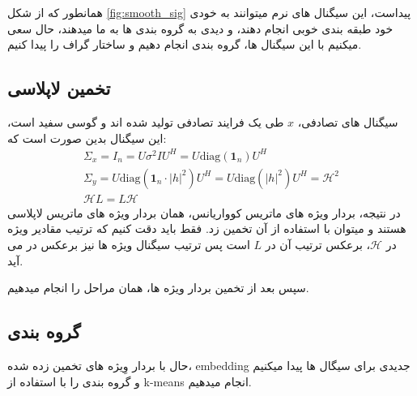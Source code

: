 همانطور که از شکل \ref*{fig:smooth_sig} پیداست، این سیگنال های نرم میتوانند به خودی خود طبقه بندی خوبی انجام دهند،
و دیدی به گروه بندی ها به ما میدهند، حال سعی میکنیم با این سیگنال ها، گروه بندی انجام دهیم و
ساختار گراف را پیدا کنیم.

\clearpage

\subsection{تخمین لاپلاسی}

سیگنال های تصادفی، $x$ طی یک فرایند تصادفی تولید شده اند و گوسی سفید است،  این سیگنال بدین صورت است که:
\begin{gather*}
        \Sigma_x=I_n=U\sigma^2IU^H=U\text{diag}(\mathbf{1}_n)U^H \\
        \Sigma_y = U\text{diag}(\mathbf{1}_n\cdot |h|^2)U^H=U\text{diag}(|h|^2)U^H=\mathcal{H}^2\\
        \mathcal{H}L=L\mathcal{H}
\end{gather*}
در نتیجه، بردار ویژه های ماتریس کوواریانس، همان بردار ویژه های ماتریس لاپلاسی هستند و میتوان با استفاده از 
آن تخمین زد. فقط باید دقت کنیم که ترتیب مقادیر ویژه در $\mathcal{H}$، برعکس ترتیب آن در $L$ است پس ترتیب سیگنال ویژه ها نیز برعکس در می آید.

سپس بعد از تخمین بردار ویژه ها، همان مراحل  را انجام میدهیم.
\subsection{گروه بندی}

حال با بردار وِیژه های تخمین زده شده، embedding جدیدی برای سیگال ها پیدا میکنیم و گروه بندی را با استفاده از k-means انجام میدهیم.

